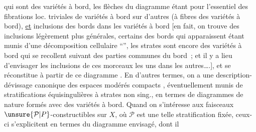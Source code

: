 %
qui sont des variétés à bord, les  flèches du diagramme étant pour l'essentiel des fibrations loc. triviales de variétés à bord sur d'autres (à fibres des variétés à bord), \uline{et}  inclusions des bords dans les variétés à bord \deleted{(}[en fait, on trouve des inclusions légèrement plus générales, certains des bords qui apparaissent étant munis d'une décomposition cellulaire ``'', %
 les strates  sont encore des variétés à bord qui se recollent suivant des parties communes du bord~; et il y a lieu d'envisager  les inclusions de ces morceaux les uns dans les autres\ldots.\deleted{)}], et se réconstitue à partir de ce diagramme . En d'autres termes, on a une description-dévissage canonique des espaces modérés compacts , éventuellement munis de stratifications équisingulières à strates non sing., en termes de diagrammes  de nature  formés avec des variétés à bord. Quand on s'intéresse aux faisceaux  $\unsure{\mathcal P|P}$-constructibles sur $X$, où $\mathcal P$ est une telle stratification fixée, ceux-ci s'explicitent en termes du diagramme envisagé, dont il

